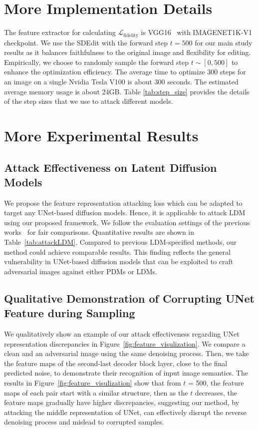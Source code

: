 \section{More Implementation Details}
The feature extractor for calculating $\mathcal{L}_\text{fidelity}$ is VGG16~\cite{Simonyan2014VeryDC} with IMAGENET1K-V1 checkpoint. We use the SDEdit with the forward step $t=500$ for our main study results as it balances faithfulness to the original image and flexibility for editing. Empirically, we choose to randomly sample the forward step $t \sim [0, 500]$ to enhance the optimization efficiency. The average time to optimize 300 steps for an image on a single Nvidia Tesla V100 is about 300 seconds. The estimated average memory usage is about 24GB. Table \ref{tab:step_size} provides the details of the step sizes that we use to attack different models. 




\section{More Experimental Results}

\subsection{Attack Effectiveness on Latent Diffusion Models}
We propose the feature representation attacking loss which can be adapted to target any UNet-based diffusion models. Hence, it is applicable to attack LDM using our proposed framework. We follow the evaluation settings of the previous works~\cite{xue2024effectiveprotectiondiffusionbased} for fair comparisons. Quantitative results are shown in Table~\ref{tab:attackLDM}. Compared to previous LDM-specified methods, our method could achieve comparable results. This finding reflects the general vulnerability in UNet-based diffusion models that can be exploited to craft adversarial images against either PDMs or LDMs. 



\subsection{Qualitative Demonstration of Corrupting UNet Feature during Sampling}
We qualitatively show an example of our attack effectiveness regarding UNet representation discrepancies in Figure~\ref{fig:feature_visulization}. We compare a clean and an adversarial image using the same denoising process. Then, we take the feature maps of the second-last decoder block layer, close to the final predicted noise, to demonstrate their recognition of input image semantics.
The results in Figure~\ref{fig:feature_visulization} show that from $t$ = 500, the feature maps of each pair start with a similar structure, then as the $t$ decreases, the feature maps gradually have higher discrepancies, suggesting our method, by attacking the middle representation of UNet, can effectively disrupt the reverse denoising process and mislead to corrupted samples.

